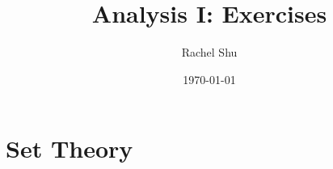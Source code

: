 \documentclass[notitlepage]{report}
\title{Analysis I: Exercises}
\author{Rachel Shu}
\date{\today}
\newif\ifmainfile
\begin{document}
\mainfiletrue

\maketitle
\tableofcontents

\addtocounter{chapter}{2}
\chapter{Set Theory}

\end{document}
